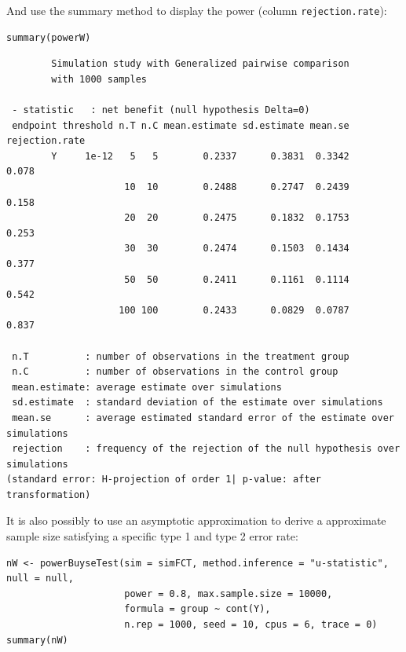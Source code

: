 \documentclass[12pt]{article}
\begin{document}
\clearpage

And use the summary method to display the power (column
\texttt{rejection.rate}):
\lstset{language=r,label= ,caption= ,captionpos=b,numbers=none}
\begin{lstlisting}
summary(powerW)
\end{lstlisting}

\begin{verbatim}
        Simulation study with Generalized pairwise comparison
        with 1000 samples

 - statistic   : net benefit (null hypothesis Delta=0)
 endpoint threshold n.T n.C mean.estimate sd.estimate mean.se rejection.rate
        Y     1e-12   5   5        0.2337      0.3831  0.3342          0.078
                     10  10        0.2488      0.2747  0.2439          0.158
                     20  20        0.2475      0.1832  0.1753          0.253
                     30  30        0.2474      0.1503  0.1434          0.377
                     50  50        0.2411      0.1161  0.1114          0.542
                    100 100        0.2433      0.0829  0.0787          0.837

 n.T          : number of observations in the treatment group
 n.C          : number of observations in the control group
 mean.estimate: average estimate over simulations
 sd.estimate  : standard deviation of the estimate over simulations
 mean.se      : average estimated standard error of the estimate over simulations
 rejection    : frequency of the rejection of the null hypothesis over simulations
(standard error: H-projection of order 1| p-value: after transformation)
\end{verbatim}

It is also possibly to use an asymptotic approximation to derive a
approximate sample size satisfying a specific type 1 and type 2 error
rate:
\lstset{language=r,label= ,caption= ,captionpos=b,numbers=none}
\begin{lstlisting}
nW <- powerBuyseTest(sim = simFCT, method.inference = "u-statistic", null = null,
                     power = 0.8, max.sample.size = 10000,                     
                     formula = group ~ cont(Y), 
                     n.rep = 1000, seed = 10, cpus = 6, trace = 0)
summary(nW)
\end{lstlisting}
\end{document}
